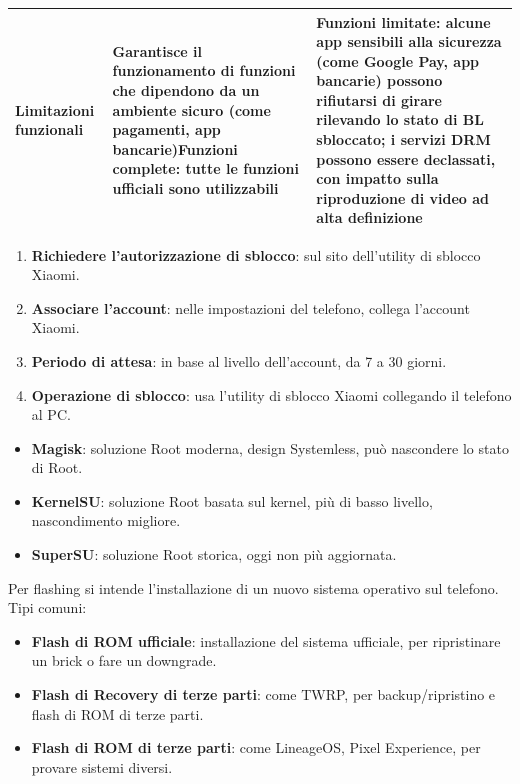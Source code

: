 \begin{center}
\begin{tabularx}{\linewidth}{|X|X|X|}
Limitazioni funzionali & Garantisce il funzionamento di funzioni che dipendono da un ambiente sicuro (come pagamenti, app bancarie)\newline Funzioni complete: tutte le funzioni ufficiali sono utilizzabili & Funzioni limitate: alcune app sensibili alla sicurezza (come Google Pay, app bancarie) possono rifiutarsi di girare rilevando lo stato di BL sbloccato; i servizi DRM possono essere declassati, con impatto sulla riproduzione di video ad alta definizione \tabularnewline
\hline
\end{tabularx}
\end{center}


\begin{enumerate}
  \item \textbf{Richiedere l'autorizzazione di sblocco}: sul sito dell'utility di sblocco Xiaomi.
  \item \textbf{Associare l'account}: nelle impostazioni del telefono, collega l'account Xiaomi.
  \item \textbf{Periodo di attesa}: in base al livello dell'account, da 7 a 30 giorni.
  \item \textbf{Operazione di sblocco}: usa l'utility di sblocco Xiaomi collegando il telefono al PC.
\end{enumerate}


\begin{itemize}
  \item \textbf{Magisk}: soluzione Root moderna, design Systemless, può nascondere lo stato di Root.
  \item \textbf{KernelSU}: soluzione Root basata sul kernel, più di basso livello, nascondimento migliore.
  \item \textbf{SuperSU}: soluzione Root storica, oggi non più aggiornata.
\end{itemize}


Per flashing si intende l'installazione di un nuovo sistema operativo sul telefono. Tipi comuni:

\begin{itemize}
  \item \textbf{Flash di ROM ufficiale}: installazione del sistema ufficiale, per ripristinare un brick o fare un downgrade.
  \item \textbf{Flash di Recovery di terze parti}: come TWRP, per backup/ripristino e flash di ROM di terze parti.
  \item \textbf{Flash di ROM di terze parti}: come LineageOS, Pixel Experience, per provare sistemi diversi.
\end{itemize}

